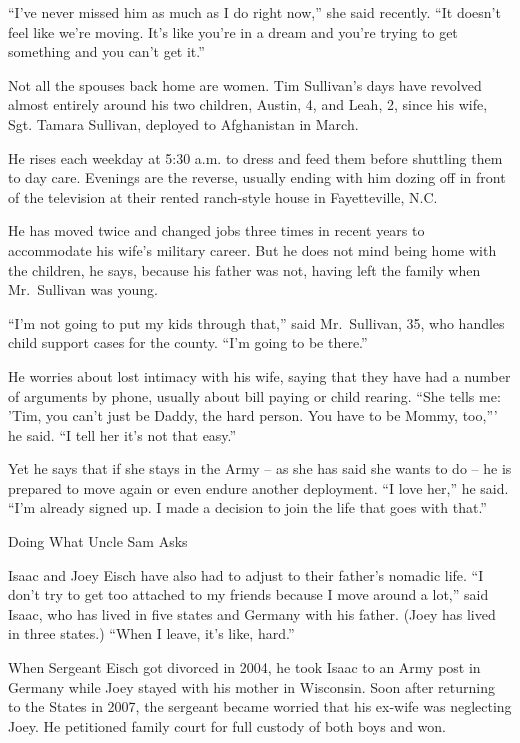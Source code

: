 ﻿\documentclass[12pt]{article}
\begin{document}
``I've never missed him as much as I do right now,'' she said recently. ``It doesn't feel like we're
moving. It's like you're in a dream and you're trying to get something and you can't get it.''

Not all the spouses back home are women. Tim Sullivan's days have revolved almost entirely around
his two children, Austin, 4, and Leah, 2, since his wife, Sgt. Tamara Sullivan, deployed to
Afghanistan in March.

He rises each weekday at 5:30 a.m. to dress and feed them before shuttling them to day care.
Evenings are the reverse, usually ending with him dozing off in front of the television at their
rented ranch-style house in Fayetteville, N.C.

He has moved twice and changed jobs three times in recent years to accommodate his wife's military
career. But he does not mind being home with the children, he says, because his father was not,
having left the family when Mr.~Sullivan was young.

``I'm not going to put my kids through that,'' said Mr.~Sullivan, 35, who handles child support
cases for the county. ``I'm going to be there.''

He worries about lost intimacy with his wife, saying that they have had a number of arguments by
phone, usually about bill paying or child rearing. ``She tells me: 'Tim, you can't just be Daddy,
the hard person. You have to be Mommy, too,''' he said. ``I tell her it's not that easy.''

Yet he says that if she stays in the Army -- as she has said she wants to do -- he is prepared to
move again or even endure another deployment. ``I love her,'' he said. ``I'm already signed up. I
made a decision to join the life that goes with that.''

Doing What Uncle Sam Asks

Isaac and Joey Eisch have also had to adjust to their father's nomadic life. ``I don't try to get
too attached to my friends because I move around a lot,'' said Isaac, who has lived in five states
and Germany with his father. (Joey has lived in three states.) ``When I leave, it's like, hard.''

When Sergeant Eisch got divorced in 2004, he took Isaac to an Army post in Germany while Joey stayed
with his mother in Wisconsin. Soon after returning to the States in 2007, the sergeant became
worried that his ex-wife was neglecting Joey. He petitioned family court for full custody of both
boys and won.
\end{document}
